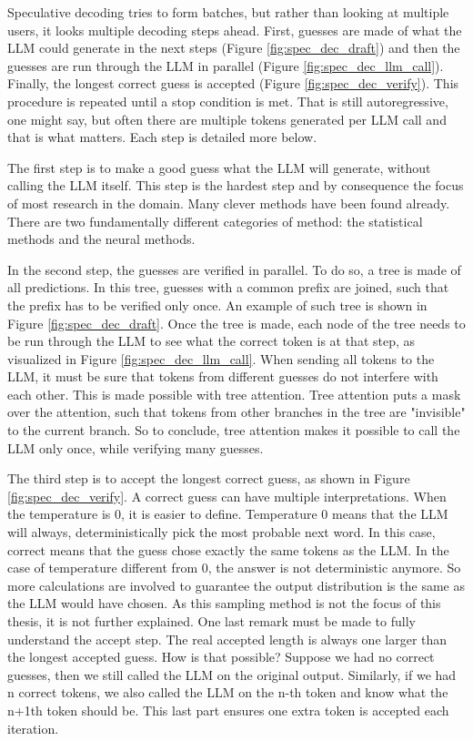 Speculative decoding tries to form batches, but rather than looking at multiple users, it looks multiple decoding steps ahead. First, guesses are made of what the LLM could generate in the next steps (Figure \ref{fig:spec_dec_draft}) and then the guesses are run through the LLM in parallel (Figure \ref{fig:spec_dec_llm_call}). Finally, the longest correct guess is accepted (Figure \ref{fig:spec_dec_verify}). This procedure is repeated until a stop condition is met. That is still autoregressive, one might say, but often there are multiple tokens generated per LLM call and that is what matters. Each step is detailed more below.

The first step is to make a good guess what the LLM will generate, without calling the LLM itself. This step is the hardest step and by consequence the focus of most research in the domain. Many clever methods have been found already. There are two fundamentally different categories of method: the statistical methods and the neural methods.

In the second step, the guesses are verified in parallel. To do so, a tree is made of all predictions. In this tree, guesses with a common prefix are joined, such that the prefix has to be verified only once. An example of such tree is shown in Figure \ref{fig:spec_dec_draft}. Once the tree is made, each node of the tree needs to be run through the LLM to see what the correct token is at that step, as visualized in Figure \ref{fig:spec_dec_llm_call}. When sending all tokens to the LLM, it must be sure that tokens from different guesses do not interfere with each other. This is made possible with tree attention. Tree attention puts a mask over the attention, such that tokens from other branches in the tree are "invisible" to the current branch. So to conclude, tree attention makes it possible to call the LLM only once, while verifying many guesses.

The third step is to accept the longest correct guess, as shown in Figure \ref{fig:spec_dec_verify}. A correct guess can have multiple interpretations. When the temperature is 0, it is easier to define. Temperature 0 means that the LLM will always, deterministically pick the most probable next word. In this case, correct means that the guess chose exactly the same tokens as the LLM. In the case of temperature different from 0, the answer is not deterministic anymore. So more calculations are involved to guarantee the output distribution is the same as the LLM would have chosen. As this sampling method is not the focus of this thesis, it is not further explained. One last remark must be made to fully understand the accept step. The real accepted length is always one larger than the longest accepted guess. How is that possible? Suppose we had no correct guesses, then we still called the LLM on the original output. Similarly, if we had n correct tokens, we also called the LLM on the n-th token and know what the n+1th token should be. This last part ensures one extra token is accepted each iteration.


